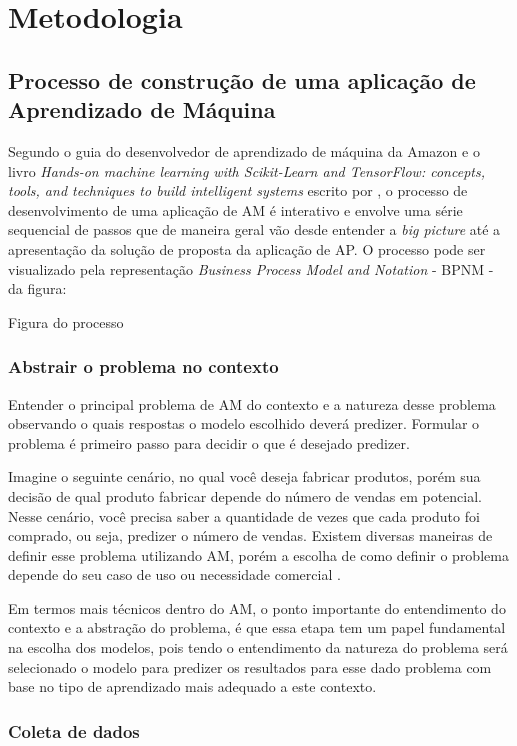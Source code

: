 \chapter{Metodologia}
\section{Processo de construção de uma aplicação de Aprendizado de Máquina}

Segundo o guia do desenvolvedor de aprendizado de máquina da Amazon e o livro \textit{Hands-on machine learning with Scikit-Learn and TensorFlow: concepts, tools, and techniques to build intelligent systems} escrito por \cite{geron2017hands}, o processo de desenvolvimento de uma aplicação de AM é interativo e envolve uma série sequencial de passos que de maneira geral vão desde entender a \textit{big picture} até a apresentação da solução de proposta da aplicação de AP. O processo pode ser visualizado pela representação \textit{Business Process Model and Notation} - BPNM - da figura:

Figura do processo

\subsection{Abstrair o problema no contexto}

Entender o principal problema de AM do contexto e a natureza desse problema observando o quais respostas o modelo escolhido deverá predizer. Formular o problema é primeiro passo para decidir o que é desejado predizer.

Imagine o seguinte cenário, no qual você deseja fabricar produtos, porém sua decisão de qual produto fabricar depende do número de vendas em potencial. Nesse cenário, você precisa saber a quantidade de vezes que cada produto foi comprado, ou seja, predizer o número de vendas. Existem diversas maneiras de definir esse problema utilizando AM, porém a escolha de como definir o problema depende do seu caso de uso ou necessidade comercial \cite{Amazon}.

Em termos mais técnicos dentro do AM, o ponto importante do entendimento do contexto e a abstração do problema, é que essa etapa tem um papel fundamental na escolha dos modelos, pois tendo o entendimento da natureza do problema será selecionado o modelo para predizer os resultados para esse dado problema com base no tipo de aprendizado mais adequado a este contexto.

\subsection{Coleta de dados}

